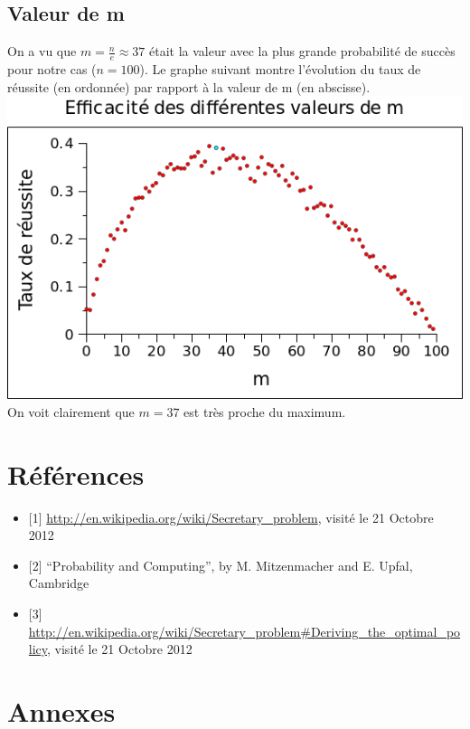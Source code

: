 \documentclass[a4paper,10pt]{article}
\begin{document}
\subsection{Valeur de m}
On a vu que
\begin{math}m = \frac{n}{e} \approx 37\end{math}
était la valeur avec la plus grande probabilité de succès pour notre cas
(\begin{math}n = 100\end{math}).
Le graphe suivant montre l'évolution du taux de réussite
(en ordonnée) par rapport à la valeur de m (en abscisse).\\

\includegraphics[scale=0.5]{../success_m_graph.png}\\

On voit clairement que
\begin{math}
 m = 37
\end{math}
est très proche du maximum.


\section{Références}
\begin{itemize}
  \item {[}1] \url{http://en.wikipedia.org/wiki/Secretary_problem}, visité le 21 Octobre 2012
  \item {[}2] “Probability and Computing”, by M. Mitzenmacher and E. Upfal, Cambridge
  \item {[}3] \url{http://en.wikipedia.org/wiki/Secretary_problem#Deriving_the_optimal_policy}, visité le 21 Octobre 2012
\end{itemize}
\section{Annexes}
\end{document}
